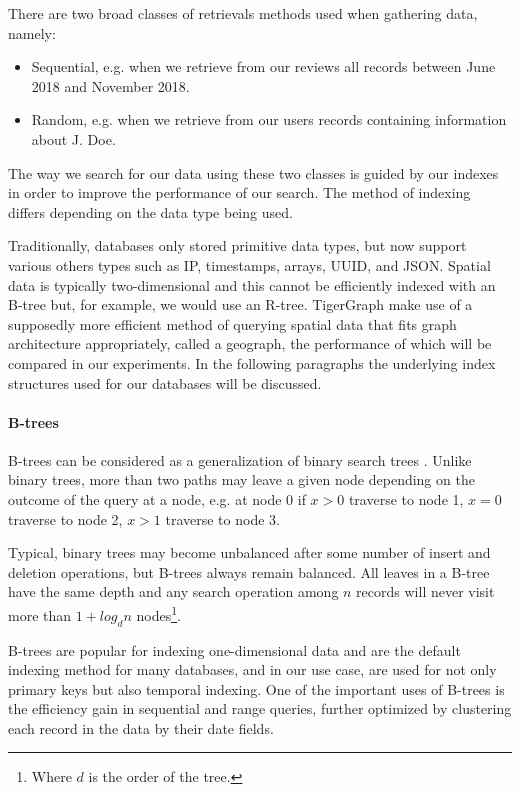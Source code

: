 There are two broad classes \cite{btree} of retrievals methods used when gathering data, namely:
\begin{itemize}
    \item Sequential, e.g. when we retrieve from our reviews all records between June 2018 and November 2018.
    \item Random, e.g. when we retrieve from our users records containing information about J. Doe.
\end{itemize}
The way we search for our data using these two classes is guided by our indexes in order to improve the performance of our search. The method of indexing differs depending on the data type being used.

Traditionally, databases only stored primitive data types, but now support various others types such as IP, timestamps, arrays, UUID, and JSON. Spatial data is typically two-dimensional and this cannot be efficiently indexed with an B-tree but, for example, we would use an R-tree. TigerGraph make use of a supposedly more efficient method of querying spatial data that fits graph architecture appropriately, called a geograph, the performance of which will be compared in our experiments. In the following paragraphs the underlying index structures used for our databases will be discussed.

\paragraph{B-trees}
B-trees can be considered as a generalization of binary search trees \cite{btree}. Unlike binary trees, more than two paths may leave a given node depending on the outcome of the query at a node, e.g. at node 0 if $x>0$ traverse to node 1, $x=0$ traverse to node 2, $x>1$ traverse to node 3.

Typical, binary trees may become unbalanced after some number of insert and deletion operations, but B-trees always remain balanced. All leaves in a B-tree have the same depth and any search operation among $n$ records will never visit more than $1 + log_dn$ nodes\footnote{Where $d$ is the order of the tree.}.

B-trees are popular for indexing one-dimensional data and are the default indexing method for many databases, and in our use case, are used for not only primary keys but also temporal indexing. One of the important uses of B-trees is the efficiency gain in sequential and range queries, further optimized by clustering each record in the data by their date fields.

